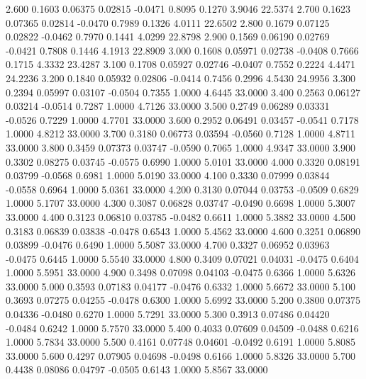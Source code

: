    2.600   0.1603   0.06375   0.02815  -0.0471   0.8095   0.1270   3.9046  22.5374
   2.700   0.1623   0.07365   0.02814  -0.0470   0.7989   0.1326   4.0111  22.6502
   2.800   0.1679   0.07125   0.02822  -0.0462   0.7970   0.1441   4.0299  22.8798
   2.900   0.1569   0.06190   0.02769  -0.0421   0.7808   0.1446   4.1913  22.8909
   3.000   0.1608   0.05971   0.02738  -0.0408   0.7666   0.1715   4.3332  23.4287
   3.100   0.1708   0.05927   0.02746  -0.0407   0.7552   0.2224   4.4471  24.2236
   3.200   0.1840   0.05932   0.02806  -0.0414   0.7456   0.2996   4.5430  24.9956
   3.300   0.2394   0.05997   0.03107  -0.0504   0.7355   1.0000   4.6445  33.0000
   3.400   0.2563   0.06127   0.03214  -0.0514   0.7287   1.0000   4.7126  33.0000
   3.500   0.2749   0.06289   0.03331  -0.0526   0.7229   1.0000   4.7701  33.0000
   3.600   0.2952   0.06491   0.03457  -0.0541   0.7178   1.0000   4.8212  33.0000
   3.700   0.3180   0.06773   0.03594  -0.0560   0.7128   1.0000   4.8711  33.0000
   3.800   0.3459   0.07373   0.03747  -0.0590   0.7065   1.0000   4.9347  33.0000
   3.900   0.3302   0.08275   0.03745  -0.0575   0.6990   1.0000   5.0101  33.0000
   4.000   0.3320   0.08191   0.03799  -0.0568   0.6981   1.0000   5.0190  33.0000
   4.100   0.3330   0.07999   0.03844  -0.0558   0.6964   1.0000   5.0361  33.0000
   4.200   0.3130   0.07044   0.03753  -0.0509   0.6829   1.0000   5.1707  33.0000
   4.300   0.3087   0.06828   0.03747  -0.0490   0.6698   1.0000   5.3007  33.0000
   4.400   0.3123   0.06810   0.03785  -0.0482   0.6611   1.0000   5.3882  33.0000
   4.500   0.3183   0.06839   0.03838  -0.0478   0.6543   1.0000   5.4562  33.0000
   4.600   0.3251   0.06890   0.03899  -0.0476   0.6490   1.0000   5.5087  33.0000
   4.700   0.3327   0.06952   0.03963  -0.0475   0.6445   1.0000   5.5540  33.0000
   4.800   0.3409   0.07021   0.04031  -0.0475   0.6404   1.0000   5.5951  33.0000
   4.900   0.3498   0.07098   0.04103  -0.0475   0.6366   1.0000   5.6326  33.0000
   5.000   0.3593   0.07183   0.04177  -0.0476   0.6332   1.0000   5.6672  33.0000
   5.100   0.3693   0.07275   0.04255  -0.0478   0.6300   1.0000   5.6992  33.0000
   5.200   0.3800   0.07375   0.04336  -0.0480   0.6270   1.0000   5.7291  33.0000
   5.300   0.3913   0.07486   0.04420  -0.0484   0.6242   1.0000   5.7570  33.0000
   5.400   0.4033   0.07609   0.04509  -0.0488   0.6216   1.0000   5.7834  33.0000
   5.500   0.4161   0.07748   0.04601  -0.0492   0.6191   1.0000   5.8085  33.0000
   5.600   0.4297   0.07905   0.04698  -0.0498   0.6166   1.0000   5.8326  33.0000
   5.700   0.4438   0.08086   0.04797  -0.0505   0.6143   1.0000   5.8567  33.0000
